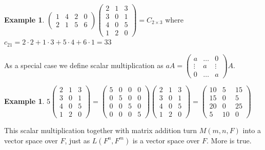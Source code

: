 \documentclass[12pt]{amsart}
\theoremstyle{definition}
\newtheorem{example}[theorem]{Example}
\begin{document}
\begin{example} $\left(\begin{array}{cccc} 1 & 4 & 2 & 0 \\ 2 & 1 & 5 & 6 \end{array}\right) \left(\begin{array}{ccc} 2 & 1 & 3 \\ 3 & 0 & 1 \\ 4 & 0 & 5 \\ 1 & 2 & 0 \end{array}\right) = C_{2 \times 3}$ where $c_{21} = 2 \cdot 2 + 1 \cdot 3 + 5 \cdot 4 + 6 \cdot 1 = 33$
\end{example}

As a special case we define scalar multiplication as $a A = \left(\begin{array}{ccc} a & \dots & 0 \\ \vdots & a & \vdots \\ 0 & \dots & a \end{array}\right)A$.

\begin{example} $5\left(\begin{array}{ccc} 2 & 1 & 3 \\ 3 & 0 & 1 \\ 4 & 0 & 5 \\ 1 & 2 & 0 \end{array}\right) = \left(\begin{array}{cccc} 5 & 0 & 0 & 0 \\ 0 & 5 & 0 & 0 \\ 0 & 0 & 5 & 0 \\ 0 & 0 & 0 & 5\end{array}\right)\left(\begin{array}{ccc} 2 & 1 & 3 \\ 3 & 0 & 1 \\ 4 & 0 & 5 \\ 1 & 2 & 0 \end{array}\right) = \left(\begin{array}{ccc} 10 & 5 & 15 \\ 15 & 0 & 5 \\ 20 & 0 & 25 \\ 5 & 10 & 0 \end{array}\right)$
\end{example}

This scalar multiplication together with matrix addition turn $M(m, n, F)$ into a vector space over $F$, just as $L(F^n,F^m)$ is a vector space over $F$. More is true.
\end{document}
